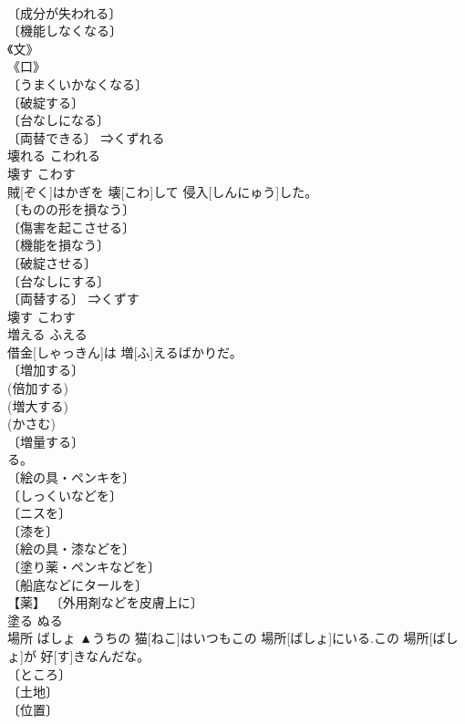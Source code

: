 \documentclass[8pt]{extreport}
\begin{document}
\begin{CJK}{UTF8}{min}
\\	〔成分が失われる〕 
\\	〔機能しなくなる〕 
\\	《文》 
\\	《口》 
\\	〔うまくいかなくなる〕 
\\	〔破綻する〕 
\\	〔台なしになる〕 
\\	〔両替できる〕 ⇒くずれる 
\\	壊れる	こわれる	
\\	壊す	こわす	
\\	賊[ぞく]はかぎを 壊[こわ]して 侵入[しんにゅう]した。	
\\	〔ものの形を損なう〕 
\\	〔傷害を起こさせる〕 
\\	〔機能を損なう〕 
\\	〔破綻させる〕 
\\	〔台なしにする〕 
\\	〔両替する〕 ⇒くずす 
\\	壊す	こわす	
\\	増える	ふえる	
\\	借金[しゃっきん]は 増[ふ]えるばかりだ。	
\\	〔増加する〕 
\\	(倍加する) 
\\	(増大する) 
\\	(かさむ) 
\\	〔増量する〕 
\\	[⇒ます３ 
\\	増える	ふえる	
\\	塗る	ぬる	▲さっとなでるようにペンキを 塗[ぬ]る。	
\\	〔絵の具・ペンキを〕 
\\	〔しっくいなどを〕 
\\	〔ニスを〕 
\\	〔漆を〕 
\\	〔絵の具・漆などを〕 
\\	〔塗り薬・ペンキなどを〕 
\\	〔船底などにタールを〕 
\\	【薬】 〔外用剤などを皮膚上に〕 
\\	塗る	ぬる	
\\	場所	ばしょ	▲うちの 猫[ねこ]はいつもこの 場所[ばしょ]にいる.この 場所[ばしょ]が 好[す]きなんだな。	
\\	〔ところ〕 
\\	〔土地〕 
\\	〔位置〕 

\end{CJK}
\end{document}
